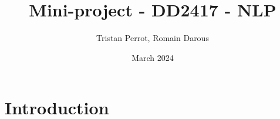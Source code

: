 \documentclass{article}
\title{Mini-project - DD2417 - NLP}
\author{Tristan Perrot, Romain Darous}
\date{March 2024}
\begin{document}
\maketitle

\section{Introduction}
\end{document}
